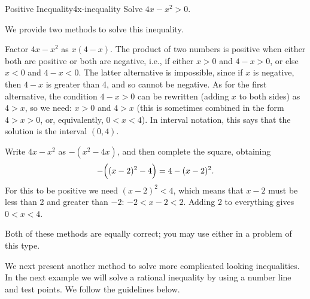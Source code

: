 \bigskip

\begin{example}{Positive Inequality}{4x-inequality}
Solve $4x-x^2>0$.
\end{example}

\begin{solution}
We provide two methods to solve this inequality.

\bigskip
\noindent
{} Factor $4x-x^2$ as $x(4-x)$.  The product of two numbers
is positive when either both are positive or both are negative, i.e., if
either $x>0$ and $4-x>0$, or else $x<0$ and $4-x<0$.  The latter alternative
is impossible, since if $x$ is negative, then $4-x$ is greater than 4, and
so cannot be negative.  As for the first alternative, the condition $4-x>0$
can be rewritten (adding $x$ to both sides) as $4>x$, so we need:
$x>0$ and $4>x$ (this is sometimes combined in the form $4>x>0$, or,
equivalently, $0<x<4$).  In interval notation, this says that the solution
is the interval $(0,4)$.

\bigskip
\noindent
{}  Write $4x-x^2$ as $-(x^2-4x)$, and then complete
the square, obtaining 
$$-\Bigl((x-2)^2-4\Bigr)=4-(x-2)^2.$$  
For this to be positive we need $(x-2)^2<4$, which means that $x-2$ must be less
than 2 and greater than $-2$:  $-2<x-2<2$.  Adding 2 to everything gives
$0<x<4$.  

\bigskip
\noindent
Both of these methods are equally correct; you may use either
in a problem of this type.
\end{solution}

We next present another method to solve more complicated looking inequalities.
In the next example we will solve a rational inequality by using 
a number line and test points. We follow the guidelines below.\\


